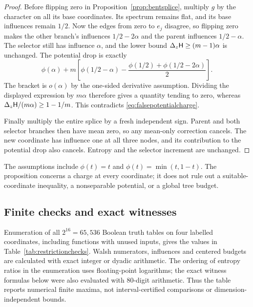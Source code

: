\begin{proof}
Before flipping zero in Proposition~\ref{prop:bentsplice},
multiply $g$ by the character on all its base coordinates.
Its spectrum remains flat, and its base influences remain
$1/2$. Now the edges from zero to $e_j$ disagree, so flipping
zero makes the other branch's influences $1/2-2\alpha$ and
the parent influences $1/2-\alpha$.
The selector still has influence $\alpha$, and the lower bound
$\Delta_z\mathsf H\ge(m-1)\alpha$ is unchanged.
The potential drop is exactly
\[
 \phi(\alpha)+m\left[
 \phi(1/2-\alpha)
 -\frac{\phi(1/2)+\phi(1/2-2\alpha)}2\right].
\]
The bracket is $o(\alpha)$ by the one-sided derivative
assumption. Dividing the displayed expression by $m\alpha$
therefore gives a quantity tending to zero, whereas
$\Delta_z\mathsf H/(m\alpha)\ge1-1/m$.
This contradicts \eqref{eq:falsepotentialcharge}.

Finally multiply the entire splice by a fresh independent sign.
Parent and both selector branches then have mean zero, so any
mean-only correction cancels. The new coordinate has influence
one at all three nodes, and its contribution to the potential
drop also cancels. Entropy and the selector increment are
unchanged.
\end{proof}

The assumptions include $\phi(t)=t$ and
$\phi(t)=\min(t,1-t)$. The proposition concerns a charge at
every coordinate; it does not rule out a suitable-coordinate
inequality, a nonseparable potential, or a global tree budget.

\subsection{Finite checks and exact witnesses}\label{subsec:restrictionchecks}

Enumeration of all $2^{16}=65,536$ Boolean truth tables on four
labelled coordinates, including functions with unused inputs,
gives the values in Table~\ref{tab:restrictionchecks}.
Walsh numerators, influences and centered budgets are calculated
with exact integer or dyadic arithmetic. The ordering of
entropy ratios in the enumeration uses floating-point
logarithms; the exact witness formulas below were also evaluated
with 80-digit arithmetic. Thus the table reports numerical
finite maxima, not interval-certified comparisons or
dimension-independent bounds.

